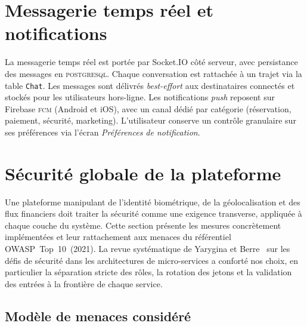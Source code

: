 \documentclass[12pt, a4paper, oneside]{report}
\begin{document}
\section{Messagerie temps réel et notifications}
\label{sec:realisation-messagerie}

La messagerie temps réel est portée par Socket.IO côté serveur, avec persistance des messages en \textsc{postgresql}. Chaque conversation est rattachée à un trajet via la table \texttt{Chat}. Les messages sont délivrés \textit{best-effort} aux destinataires connectés et stockés pour les utilisateurs hors-ligne. Les notifications \textit{push} reposent sur Firebase \textsc{fcm} (Android et iOS), avec un canal dédié par catégorie (réservation, paiement, sécurité, marketing). L'utilisateur conserve un contrôle granulaire sur ses préférences via l'écran \textit{Préférences de notification}.

\section{Sécurité globale de la plateforme}
\label{sec:securite}

Une plateforme manipulant de l'identité biométrique, de la géolocalisation et des flux financiers doit traiter la sécurité comme une exigence transverse, appliquée à chaque couche du système. Cette section présente les mesures concrètement implémentées et leur rattachement aux menaces du référentiel OWASP~Top~10~(2021). La revue systématique de Yarygina et Berre~\cite{yarygina_api_security_2024} sur les défis de sécurité dans les architectures de micro-services a conforté nos choix, en particulier la séparation stricte des rôles, la rotation des jetons et la validation des entrées à la frontière de chaque service.

\subsection{Modèle de menaces considéré}
\end{document}
